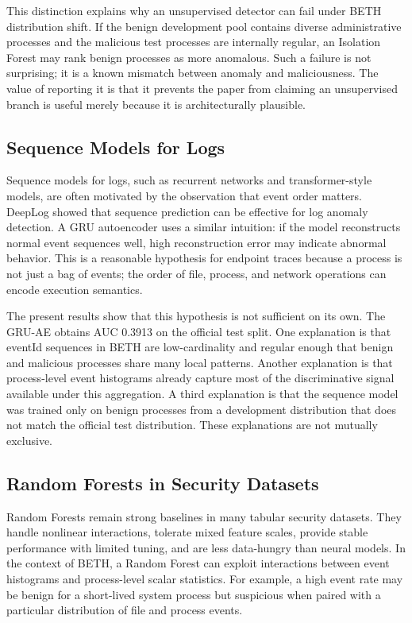 \documentclass[10pt,journal,compsoc]{IEEEtran}
\begin{document}
This distinction explains why an unsupervised detector can fail under BETH distribution shift. If the benign development pool contains diverse administrative processes and the malicious test processes are internally regular, an Isolation Forest may rank benign processes as more anomalous. Such a failure is not surprising; it is a known mismatch between anomaly and maliciousness. The value of reporting it is that it prevents the paper from claiming an unsupervised branch is useful merely because it is architecturally plausible.

\subsection{Sequence Models for Logs}

Sequence models for logs, such as recurrent networks and transformer-style models, are often motivated by the observation that event order matters. DeepLog \cite{du2017} showed that sequence prediction can be effective for log anomaly detection. A GRU autoencoder uses a similar intuition: if the model reconstructs normal event sequences well, high reconstruction error may indicate abnormal behavior. This is a reasonable hypothesis for endpoint traces because a process is not just a bag of events; the order of file, process, and network operations can encode execution semantics.

The present results show that this hypothesis is not sufficient on its own. The GRU-AE obtains AUC 0.3913 on the official test split. One explanation is that eventId sequences in BETH are low-cardinality and regular enough that benign and malicious processes share many local patterns. Another explanation is that process-level event histograms already capture most of the discriminative signal available under this aggregation. A third explanation is that the sequence model was trained only on benign processes from a development distribution that does not match the official test distribution. These explanations are not mutually exclusive.

\subsection{Random Forests in Security Datasets}

Random Forests \cite{breiman2001} remain strong baselines in many tabular security datasets. They handle nonlinear interactions, tolerate mixed feature scales, provide stable performance with limited tuning, and are less data-hungry than neural models. In the context of BETH, a Random Forest can exploit interactions between event histograms and process-level scalar statistics. For example, a high event rate may be benign for a short-lived system process but suspicious when paired with a particular distribution of file and process events.
\end{document}

